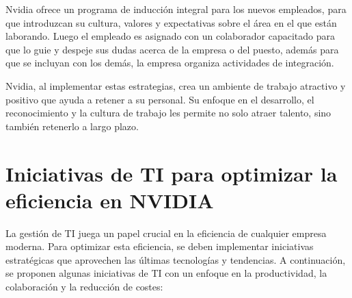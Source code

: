 \documentclass{article}
\begin{document}
Nvidia ofrece un programa de inducción integral para los nuevos empleados, para que introduzcan su cultura, valores y expectativas sobre el área en el que están laborando. Luego el empleado es asignado con un colaborador capacitado para que lo guie y despeje sus dudas acerca de la empresa o del puesto, además para que se incluyan con los demás, la empresa organiza actividades de integración.

Nvidia, al implementar estas estrategias, crea un ambiente de trabajo atractivo y positivo que ayuda a retener a su personal. Su enfoque en el desarrollo, el reconocimiento y la cultura de trabajo les permite no solo atraer talento, sino también retenerlo a largo plazo.

\newpage

\section{Iniciativas de TI para optimizar la eficiencia en NVIDIA}

La gestión de TI juega un papel crucial en la eficiencia de cualquier empresa moderna. Para optimizar esta eficiencia, se deben implementar iniciativas estratégicas que aprovechen las últimas tecnologías y tendencias. A continuación, se proponen algunas iniciativas de TI con un enfoque en la productividad, la colaboración y la reducción de costes: 
\end{document}
